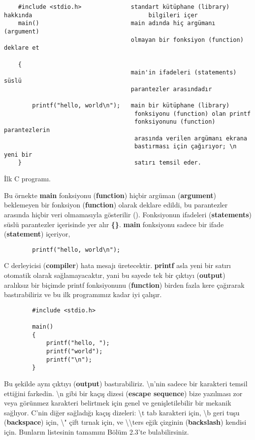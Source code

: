\documentclass[a4paper,12pt,oneside]{book}
\begin{document}
\begin{lstlisting}
    #include <stdio.h>              standart kütüphane (library) hakkında                                 bilgileri içer
    main()                          main adında hiç argümanı (argument)
                                    olmayan bir fonksiyon (function) deklare et

    {
                                    main'in ifadeleri (statements) süslü
                                    parantezler arasındadır

        printf("hello, world\n");   main bir kütüphane (library)
                                     fonksiyonu (function) olan printf
                                     fonksiyonunu (function) parantezlerin
                                     arasında verilen argümanı ekrana
                                     bastırması için çağırıyor; \n yeni bir
    }                                satırı temsil eder.
\end{lstlisting}
\begin{center}İlk C programı.\end{center}
\pagebreak

Bu örnekte \textbf{main} fonksiyonu (\textbf{function}) hiçbir argüman (\textbf{argument}) beklemeyen bir fonksiyon (\textbf{function}) olarak deklare edildi, bu parantezler arasında hiçbir veri olmamasıyla gösterilir ().
Fonksiyonun ifadeleri (\textbf{statements}) süslü parantezler içerisinde yer alır \textbf{\{\}}. \textbf{main} fonksiyonu sadece bir ifade (\textbf{statement}) içeriyor,
\begin{lstlisting}
		printf("hello, world\n");
\end{lstlisting}
C derleyicisi (\textbf{compiler}) hata mesajı üretecektir.
\textbf{printf} asla yeni bir satırı otomatik olarak sağlamayacaktır, yani bu sayede tek bir çıktıyı (\textbf{output}) aralıksız bir biçimde printf fonksiyonunu (\textbf{function}) birden fazla kere çağırarak bastırabiliriz ve bu ilk programımız kadar iyi çalışır.

\begin{lstlisting}
		#include <stdio.h>

		main()
		{
			printf("hello, ");
			printf("world");
			printf("\n");
		}
\end{lstlisting}

Bu şekilde aynı çıktıyı (\textbf{output}) bastırabiliriz.
\textbackslash n'nin sadece bir karakteri temsil ettiğini farkedin. \textbackslash n  gibi bir kaçış dizesi (\textbf{escape sequence}) bize yazılması zor veya görünmez karakteri belirtmek için genel ve genişletilebilir bir mekanik sağlıyor. C'nin diğer sağladığı kaçış dizeleri: \textbackslash t tab karakteri için, \textbackslash b geri tuşu (\textbf{backspace}) için, \textbackslash " çift tırnak için, ve  \textbackslash \textbackslash \hspace*{1mm}ters eğik çizginin (\textbf{backslash}) kendisi için. Bunların listesinin tamamını Bölüm 2.3'te bulabilirsiniz. \\
\end{document}
